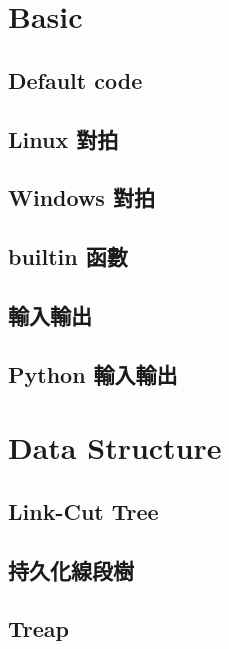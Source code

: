 \documentclass[a4paper,10pt,twocolumn,oneside]{article}
\begin{document}
\pagestyle{fancy}
\fancyfoot{}
\fancyhead[R]{\thepage}
\renewcommand{\headrulewidth}{0.4pt}
\renewcommand{\contentsname}{Contents} 

\scriptsize
\tableofcontents
\section{Basic}
\subsection{Default code}

\subsection{Linux 對拍}

\subsection{Windows 對拍}

\subsection{builtin 函數}

\subsection{輸入輸出}

\subsection{Python 輸入輸出}


\section{Data Structure}
\subsection{Link-Cut Tree}

\subsection{持久化線段樹}

\subsection{Treap}

\end{document}
